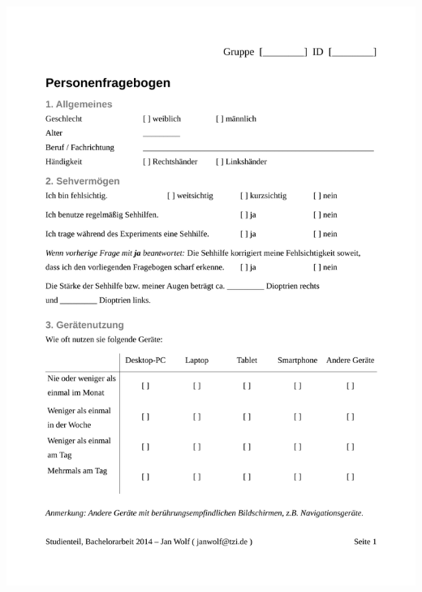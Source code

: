 \documentclass[a4paper,12pt,bibliography=totoc]{scrreprt}%
\begin{document}
\begin{appendix}
\includegraphics[width=\textwidth, page=2]{apx/Personenfragebogen}
 

\end{appendix}
\end{document}
